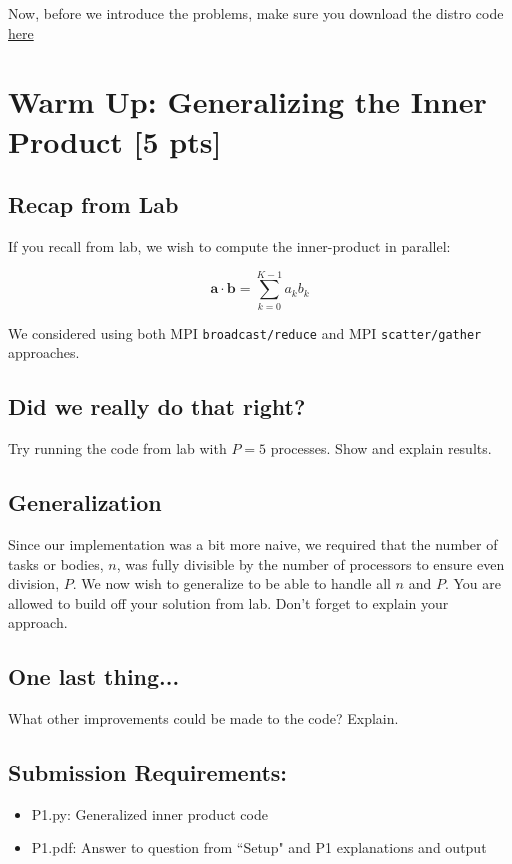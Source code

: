 \documentclass[12pt]{article}
\begin{document}
Now, before we introduce the problems, make sure you download the distro code \href{https://canvas.harvard.edu/files/302481/download?download_frd=1&verifier=NN7n9dqCxmX1toHDMaS2K6iiAO72TNldyLroynwz}{here}

\pagebreak

\section{Warm Up: Generalizing the Inner Product [5 pts]}

\subsection*{Recap from Lab}

If you recall from lab, we wish to compute the inner-product in parallel:

$$
\mathbf{a \cdot b} = \sum\limits_{k=0}^{K-1}a_k b_k
$$

We considered using both MPI \texttt{broadcast/reduce} and MPI \texttt{scatter/gather} approaches.

\subsection*{Did we really do that right?}
Try running the code from lab with $P = 5$ processes.  Show and explain results.

\subsection*{Generalization}
Since our implementation was a bit more naive, we required that the number of tasks or bodies, $n$, was fully divisible by the number of processors to ensure even division, $P$.  We now wish to generalize to be able to handle all $n$ and $P$.  You are allowed to build off your solution from lab.  Don't forget to explain your approach. \\

\subsection*{One last thing...}

What other improvements could be made to the code?  Explain.

\subsection*{Submission Requirements:}
\begin{itemize}
\item P1.py: Generalized inner product code
\item P1.pdf: Answer to question from ``Setup" and P1 explanations and output
\end{itemize}
\end{document}
